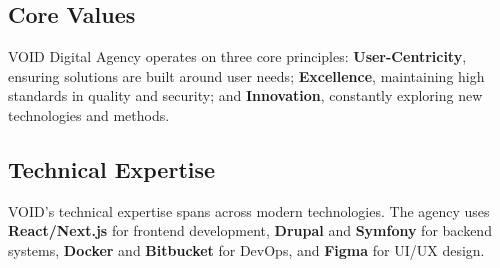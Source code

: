         

\subsection{Core Values}
\noindent
VOID Digital Agency operates on three core principles: \textbf{User-Centricity}, ensuring solutions are built around user needs; \textbf{Excellence}, maintaining high standards in quality and security; and \textbf{Innovation}, constantly exploring new technologies and methods.

\subsection{Technical Expertise}
\noindent
VOID's technical expertise spans across modern technologies. The agency uses \textbf{React/Next.js} for frontend development, \textbf{Drupal} and \textbf{Symfony} for backend systems, \textbf{Docker} and \textbf{Bitbucket} for DevOps, and \textbf{Figma} for UI/UX design.


